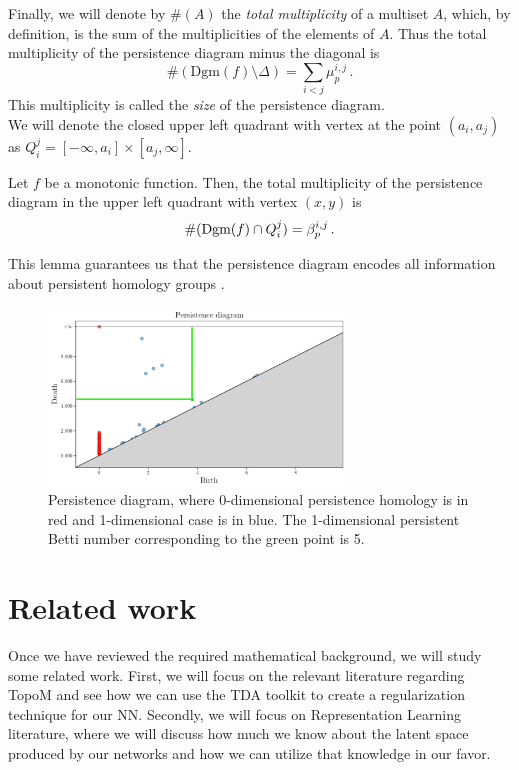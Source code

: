 \documentclass[../main.tex]{subfiles}
\begin{document}
Finally, we will denote by $\#(A)$ the \emph{total multiplicity} of a multiset $A$, which, by definition, is the sum of the multiplicities of the elements of $A$. Thus the total multiplicity of the persistence diagram minus the diagonal is
\[
\#(\text{Dgm}(f) \setminus \Delta) = \sum_{i < j} \mu_p^{i, j}\,.
\]
This multiplicity is called the \emph{size} of the persistence diagram.\\

We will denote the closed upper left quadrant with vertex at the point $(a_i, a_j)$ as $Q_{i}^{j} = [-\infty, a_i] \times [a_j, \infty]$.

\begin{lemma}
Let $f$ be a monotonic function. Then, the total multiplicity of the persistence diagram in the upper left quadrant with vertex $(x, y)$ is
\[
\#(\text{\rm Dgm}(f) \cap Q_{i}^{j})= \beta_p^{i,j}\,.
\]
\end{lemma}

This lemma guarantees us that the persistence diagram encodes all information about persistent homology groups \cite[Chapter~7]{edelsbrunner_computational_2010}.

\begin{figure}[!ht]
\centering
\includegraphics[width=0.7\textwidth]{figures/bg/persistenceEx.png} 
\caption{Persistence diagram, where 0-dimensional persistence homology is in red and 1-dimensional case is in blue. The 1-dimensional persistent Betti number corresponding to the green point is 5.}
\label{fig:persEx}
\end{figure}



\section{Related work}
Once we have reviewed the required mathematical background, we will study some related work. First, we will focus on the relevant literature regarding TopoM and see how we can use the TDA toolkit to create a regularization technique for our NN. Secondly, we will focus on Representation Learning literature, where we will discuss how much we know about the latent space produced by our networks and how we can utilize that knowledge in our favor.
\end{document}
